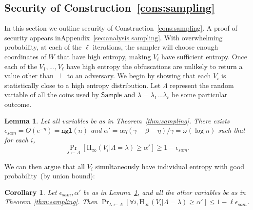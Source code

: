 \documentclass[11pt]{article}
\newcommand{\apref}[1]{\mbox{Appendix~\ref{#1}}}
\newcommand{\thref}[1]{\mbox{Theorem~\ref{#1}}}
\newcommand{\lemref}[1]{\mbox{Lemma~\ref{#1}}}
\newcommand{\consref}[1]{\mbox{Construction~\ref{#1}}}
\newcommand{\class}[1]{{\ensuremath{\mathsf{#1}}}}
\newcommand{\sample}{\ensuremath{\class{Sample}}\xspace}
\newcommand{\ngl}{\ensuremath{\mathtt{ngl}}\xspace}
\newcommand{\Hoo}{\mathrm{H}_\infty}
\newtheorem{lemma}[theorem]{Lemma}
\newtheorem{corollary}[theorem]{Corollary}
\begin{document}
\subsection{Security of \consref{cons:sampling}}
\label{ssec:sec cons sampling}
In this section we outline security of \consref{cons:sampling}.  A proof of security appears in\apref{sec:analysis sampling}.
With overwhelming probability, at each of the $\ell$ iterations, the sampler will choose enough coordinates of $W$ that have high entropy, making $V_i$ have sufficient entropy.   Once each of the $V_1,..., V_\ell$ have high entropy the obfuscations are unlikely to return a value other than $\perp$ to an adversary.
We begin by showing that each $V_i$ is statistically close to a high entropy distribution.   Let $\Lambda$ represent the random variable of all the coins used by $\sample$ and $\lambda=\lambda_1 \dots \lambda_\ell$
be some particular outcome.

\begin{lemma}
\label{lem:sampling works}
Let all variables be as in \thref{thm:sampling}.
There exists $\epsilon_{sam} = O(e^{-\eta}) = \ngl(n)$ and $\alpha' = \alpha\eta(\gamma-\beta-\eta)/\gamma = \omega(\log n)$ such that for each $i$,
\[
\Pr_{\lambda\leftarrow \Lambda}[\Hoo(V_i | \Lambda= \lambda) \geq \alpha'] \geq 1- \epsilon_{sam}.
\]
\end{lemma}

\noindent
We can then argue that all $V_i$ simultaneously have individual entropy with good probability~(by union bound):
\begin{corollary}
\label{cor:samp sec}
 Let $\epsilon_{sam}, \alpha'$ be as in \lemref{lem:sampling works}, and all the other variables be as in \thref{thm:sampling}.  Then $\Pr_{\lambda\leftarrow \Lambda}[\forall i, \Hoo(V_i | \Lambda = \lambda)  \ge \alpha'] \leq 1-\ell\epsilon_{sam}$.
\end{corollary}
\end{document}

